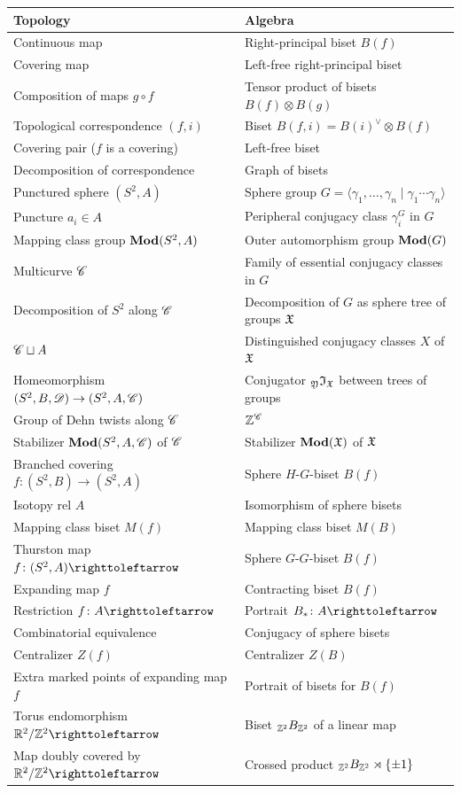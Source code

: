 \documentclass{amsart}
\begin{document}
\begin{tabular}{l|l}
  Topology & Algebra\\[2pt]\hline\rule{0pt}{3ex}\relax

  Continuous map & Right-principal biset $B(f)$\\
  Covering map & Left-free right-principal biset\\
  Composition of maps $g\circ f$ & Tensor product of bisets $B(f)\otimes B(g)$\\
  Topological correspondence $(f,i)$ & Biset $B(f,i)=B(i)^\vee\otimes B(f)$\\
  Covering pair ($f$ is a covering) & Left-free biset\\
  Decomposition of correspondence & Graph of bisets\\[1ex]

  Punctured sphere $(S^2,A)$ & Sphere group $G=\langle \gamma_1,\dots,\gamma_n\mid\gamma_1\cdots\gamma_n\rangle$\\
  Puncture $a_i\in A$ & Peripheral conjugacy class $\gamma_i^G$ in $G$\\
  Mapping class group $\mathbf{\relax Mod}(S^2,A)$ & Outer automorphism group $\mathbf{\relax Mod}(G)$\\[1ex]

  Multicurve ${\mathscr C}$ & Family of essential conjugacy classes in $G$\\
  Decomposition of $S^2$ along ${\mathscr C}$ & Decomposition of $G$ as sphere tree of groups ${\mathfrak X}$\\
  ${\mathscr C}\sqcup A$ & Distinguished conjugacy classes $X$ of ${\mathfrak X}$\\
  Homeomorphism $(S^2,B,{\mathscr D})\to(S^2,A,{\mathscr C})$ & Conjugator $\subscript\gfY\gfI_\gf$ between trees of groups\\
  Group of Dehn twists along ${\mathscr C}$ &${\mathbb Z}^{{\mathscr C}}$\\
  Stabilizer $\mathbf{\relax Mod}(S^2,A,{\mathscr C})$ of ${\mathscr C}$ & Stabilizer $\mathbf{\relax Mod}({\mathfrak X})$ of ${\mathfrak X}$\\[1ex]

  Branched covering $f\colon(S^2,B)\to(S^2,A)$ & Sphere $H$-$G$-biset $B(f)$\\
  Isotopy rel $A$ & Isomorphism of sphere bisets\\
  Mapping class biset $M(f)$ & Mapping class biset $M(B)$\\[1ex]

  Thurston map $f\colon(S^2,A)\selfmap$ & Sphere $G$-$G$-biset $B(f)$\\
  Expanding map $f$ & Contracting biset $B(f)$\\
  Restriction $f\colon A\selfmap$ & Portrait $B_*\colon A\selfmap$\\
  Combinatorial equivalence & Conjugacy of sphere bisets\\
  Centralizer $Z(f)$ & Centralizer $Z(B)$\\
  Extra marked points of expanding map $f$ & Portrait of bisets for $B(f)$\\
  Torus endomorphism $\R^2/\Z^2\selfmap$ & Biset $\subscript{\Z^2}B_{\Z^2}$ of a linear map\\
  Map doubly covered by $\R^2/\Z^2\selfmap$ & Crossed product $\subscript{\Z^2}B_{\Z^2}\rtimes\{\pm1\}$\\[1ex]


\end{tabular}
\end{document}
